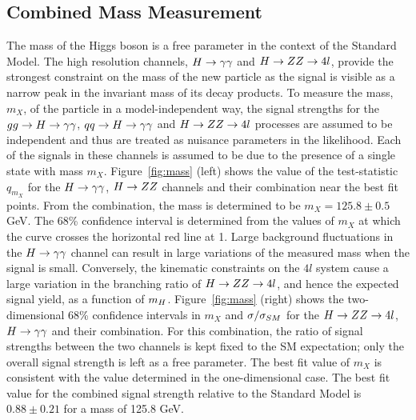 \subsection{Combined Mass Measurement}
The mass of the Higgs boson is a free parameter in the context of the 
Standard Model. The high resolution channels, 
$H\rightarrow\gamma\gamma$ and $H\rightarrow ZZ \rightarrow 4l$, 
provide the strongest constraint on the mass of the new particle as the signal
is visible as a narrow peak in the invariant mass of its decay products.
To measure the mass, $m_{X}$, of the particle in a model-independent way,
the signal strengths for the $gg\rightarrow H\rightarrow\gamma\gamma$, $qq\rightarrow H\rightarrow\gamma\gamma$
and $H\rightarrow ZZ\rightarrow 4l$ processes are assumed to be independent and thus are treated as 
nuisance parameters in the likelihood. Each of the signals in these channels
is assumed to be due to the presence of a single state with mass $m_{X}$.
Figure~\ref{fig:mass} (left) shows the value of the test-statistic 
$q_{m_{X}}$ for the $H\rightarrow\gamma\gamma$, $H\rightarrow ZZ$ channels and their combination near the
best fit points. From the combination, the mass is determined to be $m_{X}=125.8 \pm 0.5$ GeV.
The 68\% confidence interval is determined
from the values of $m_{X}$ at which the curve crosses the horizontal red line at 1.
Large background fluctuations in the $H\rightarrow\gamma\gamma$ channel can result in
large variations of the measured mass when the signal is small.  
Conversely, the kinematic constraints on the $4l$ system cause a large variation in
the branching ratio of $H\rightarrow ZZ \rightarrow 4l$, and hence the expected signal yield, 
as a function of $m_{H}$.
Figure~\ref{fig:mass} (right) shows the two-dimensional 68\% confidence intervals
in $m_{X}$ and $\sigma/\sigma_{SM}$ for the $H\rightarrow ZZ\rightarrow 4l$, $H\rightarrow\gamma\gamma$ and their combination.
For this combination, the ratio of signal strengths between the two channels is
kept fixed to the SM expectation; only the overall signal strength is left as a 
free parameter.  The best fit value of $m_{X}$ is consistent with the 
value determined in the one-dimensional case. 
The best fit value for the combined signal strength relative to the 
Standard Model is $0.88\pm0.21$ for a mass of 125.8 GeV.

